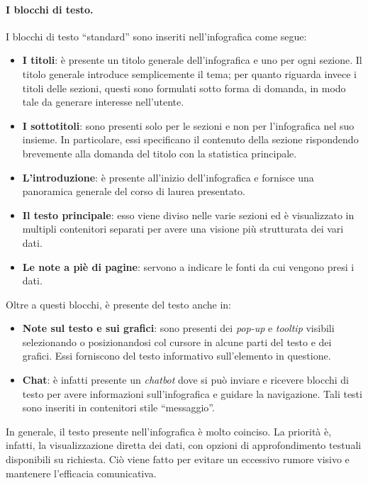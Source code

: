 \paragraph{I blocchi di testo.} I blocchi di testo ``standard'' sono inseriti nell'infografica come segue:
\begin{itemize}
    \item \textbf{I titoli}: è presente un titolo generale dell'infografica e uno per ogni sezione. Il titolo generale introduce semplicemente il tema; per quanto riguarda invece
    i titoli delle sezioni, questi sono formulati sotto forma di domanda, in modo tale da generare interesse nell'utente.
    \item \textbf{I sottotitoli}: sono presenti solo per le sezioni e non per l'infografica nel suo insieme. In particolare, essi specificano il contenuto della sezione rispondendo
    brevemente alla domanda del titolo con la statistica principale.
    \item \textbf{L'introduzione}: è presente all'inizio dell'infografica e fornisce una panoramica generale del corso di laurea presentato.
    \item \textbf{Il testo principale}: esso viene diviso nelle varie sezioni ed è visualizzato in multipli contenitori separati per avere una visione più strutturata dei vari dati.
    \item \textbf{Le note a piè di pagine}: servono a indicare le fonti da cui vengono presi i dati. 
\end{itemize}
Oltre a questi blocchi, è presente del testo anche in:
\begin{itemize}
    \item \textbf{Note sul testo e sui grafici}: sono presenti dei \emph{pop-up} e \emph{tooltip} visibili selezionando o posizionandosi col cursore in alcune parti del testo e dei grafici. Essi forniscono 
    del testo informativo sull'elemento in questione.
    \item \textbf{Chat}: è infatti presente un \emph{chatbot} dove si può inviare e ricevere blocchi di testo per avere informazioni sull'infografica e guidare la navigazione. Tali testi sono 
    inseriti in contenitori stile ``messaggio''.
\end{itemize}
In generale, il testo presente nell'infografica è molto coinciso.
La priorità è, infatti, la visualizzazione diretta dei dati, con opzioni di approfondimento testuali disponibili su richiesta. 
Ciò viene fatto per evitare un eccessivo rumore visivo e mantenere l'efficacia comunicativa.

